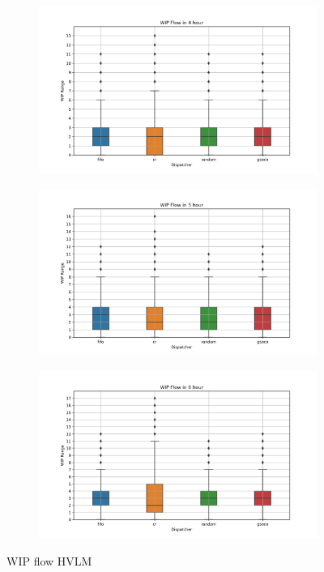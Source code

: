 \begin{figure}[t]
	\begin{subfigure}[b]{0.32\textwidth}
		\includegraphics[width=\textwidth]{HVLM/period_14400s.png}
		\caption{}
		\label{fig:p4}
	\end{subfigure}
	\hfill
	\begin{subfigure}[b]{0.32\textwidth}
		\includegraphics[width=\textwidth]{HVLM/period_18000s.png}
		\caption{}
		\label{fig:p5}
	\end{subfigure}
	\hfill
	\begin{subfigure}[b]{0.32\textwidth}
		\includegraphics[width=\textwidth]{HVLM/period_21600s.png}
		\caption{}
		\label{fig:p6}
	\end{subfigure}
	\caption{WIP flow HVLM}
	\label{fig:wip-flows-HVLM}
\end{figure}

